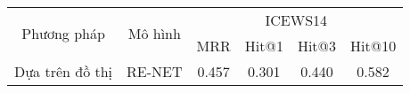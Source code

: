 \begin{table}
\begin{adjustbox}{width=\textwidth}
\begin{tabular}{|cc|cccc|}
\hline
\multicolumn{1}{|c|}{\multirow{2}{*}{Phương pháp}}     & \multirow{2}{*}{Mô hình} & \multicolumn{4}{c|}{ICEWS14}                                                                        \\ \cline{3-6} 
\multicolumn{1}{|c|}{}                                 &                          & \multicolumn{1}{c|}{MRR} & \multicolumn{1}{c|}{Hit@1} & \multicolumn{1}{c|}{Hit@3} & Hit@10         \\ \hline
\multicolumn{1}{|c|}{\multirow{4}{*}{Dựa trên đồ thị}} & RE-NET                   & 0.457                    & 0.301                      & 0.440                      & 0.582          \\ \cline{2-2}

\end{tabular}
\end{adjustbox}
\end{table}
